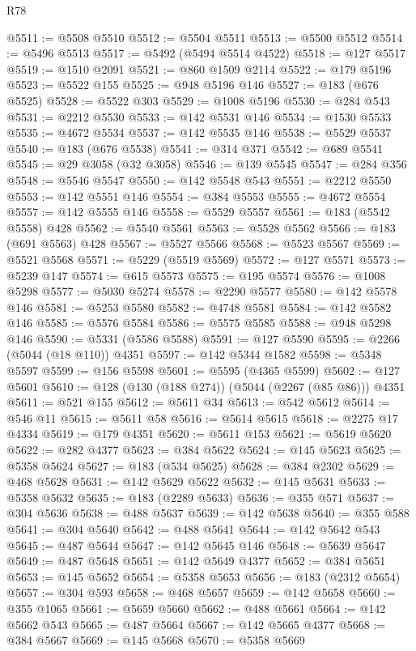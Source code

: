 \begin{lexlean}{R78}
\begin{coremodule}
@5511 := @5508 @5510
@5512 := @5504 @5511
@5513 := @5500 @5512
@5514 := @5496 @5513
@5517 := @5492 (@5494 @5514 @4522)
@5518 := @127 @5517
@5519 := @1510 @2091
@5521 := @860 @1509 @2114
@5522 := @179 @5196
@5523 := @5522 @155
@5525 := @948 @5196 @146
@5527 := @183 (@676 @5525)
@5528 := @5522 @303
@5529 := @1008 @5196
@5530 := @284 @543
@5531 := @2212 @5530
@5533 := @142 @5531 @146
@5534 := @1530 @5533
@5535 := @4672 @5534
@5537 := @142 @5535 @146
@5538 := @5529 @5537
@5540 := @183 (@676 @5538)
@5541 := @314 @371
@5542 := @689 @5541
@5545 := @29 @3058 (@32 @3058)
@5546 := @139 @5545
@5547 := @284 @356
@5548 := @5546 @5547
@5550 := @142 @5548 @543
@5551 := @2212 @5550
@5553 := @142 @5551 @146
@5554 := @384 @5553
@5555 := @4672 @5554
@5557 := @142 @5555 @146
@5558 := @5529 @5557
@5561 := @183 (@5542 @5558) @428
@5562 := @5540 @5561
@5563 := @5528 @5562
@5566 := @183 (@691 @5563) @428
@5567 := @5527 @5566
@5568 := @5523 @5567
@5569 := @5521 @5568
@5571 := @5229 (@5519 @5569)
@5572 := @127 @5571
@5573 := @5239 @147
@5574 := @615 @5573
@5575 := @195 @5574
@5576 := @1008 @5298
@5577 := @5030 @5274
@5578 := @2290 @5577
@5580 := @142 @5578 @146
@5581 := @5253 @5580
@5582 := @4748 @5581
@5584 := @142 @5582 @146
@5585 := @5576 @5584
@5586 := @5575 @5585
@5588 := @948 @5298 @146
@5590 := @5331 (@5586 @5588)
@5591 := @127 @5590
@5595 := @2266 (@5044 (@18 @110)) @4351
@5597 := @142 @5344 @1582
@5598 := @5348 @5597
@5599 := @156 @5598
@5601 := @5595 (@4365 @5599)
@5602 := @127 @5601
@5610 := @128 (@130 (@188 @274)) (@5044 (@2267 (@85 @86))) @4351
@5611 := @521 @155
@5612 := @5611 @34
@5613 := @542 @5612
@5614 := @546 @11
@5615 := @5611 @58
@5616 := @5614 @5615
@5618 := @2275 @17 @4334
@5619 := @179 @4351
@5620 := @5611 @153
@5621 := @5619 @5620
@5622 := @282 @4377
@5623 := @384 @5622
@5624 := @145 @5623
@5625 := @5358 @5624
@5627 := @183 (@534 @5625)
@5628 := @384 @2302
@5629 := @468 @5628
@5631 := @142 @5629 @5622
@5632 := @145 @5631
@5633 := @5358 @5632
@5635 := @183 (@2289 @5633)
@5636 := @355 @571
@5637 := @304 @5636
@5638 := @488 @5637
@5639 := @142 @5638
@5640 := @355 @588
@5641 := @304 @5640
@5642 := @488 @5641
@5644 := @142 @5642 @543
@5645 := @487 @5644
@5647 := @142 @5645 @146
@5648 := @5639 @5647
@5649 := @487 @5648
@5651 := @142 @5649 @4377
@5652 := @384 @5651
@5653 := @145 @5652
@5654 := @5358 @5653
@5656 := @183 (@2312 @5654)
@5657 := @304 @593
@5658 := @468 @5657
@5659 := @142 @5658
@5660 := @355 @1065
@5661 := @5659 @5660
@5662 := @488 @5661
@5664 := @142 @5662 @543
@5665 := @487 @5664
@5667 := @142 @5665 @4377
@5668 := @384 @5667
@5669 := @145 @5668
@5670 := @5358 @5669

\end{coremodule}
\end{lexlean}
